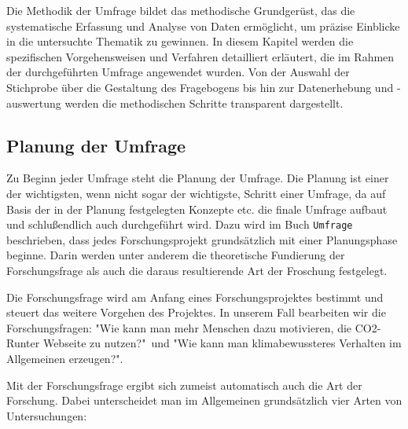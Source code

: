 
Die Methodik der Umfrage bildet das methodische Grundgerüst, das die systematische Erfassung und Analyse von Daten ermöglicht, um präzise Einblicke in die untersuchte Thematik zu gewinnen. In diesem Kapitel werden die spezifischen Vorgehensweisen und Verfahren detailliert erläutert, die im Rahmen der durchgeführten Umfrage angewendet wurden.
Von der Auswahl der Stichprobe über die Gestaltung des Fragebogens bis hin zur Datenerhebung und -auswertung werden die methodischen Schritte transparent dargestellt.

\subsection{Planung der Umfrage}
Zu Beginn jeder Umfrage steht die Planung der Umfrage.
Die Planung ist einer der wichtigsten, wenn nicht sogar der wichtigste, Schritt einer Umfrage, da auf Basis der in der Planung festgelegten Konzepte etc.
die finale Umfrage aufbaut und schlußendlich auch durchgeführt wird.
Dazu wird im Buch \texttt{Umfrage} beschrieben, dass jedes Forschungsprojekt grundsätzlich mit einer Planungsphase beginne.
Darin werden unter anderem die theoretische Fundierung der Forschungsfrage als auch die daraus resultierende Art der Froschung festgelegt.\cite{umfrage:2011}

Die Forschungsfrage wird am Anfang eines Forschungsprojektes bestimmt und steuert das weitere Vorgehen des Projektes. \cite{umfrage:2011}
In unserem Fall bearbeiten wir die Forschungsfragen: "Wie kann man mehr Menschen dazu motivieren, die CO2-Runter Webseite zu nutzen?"\ und "Wie kann man klimabewussteres Verhalten im Allgemeinen erzeugen?".

Mit der Forschungsfrage ergibt sich zumeist automatisch auch die Art der Forschung.
Dabei unterscheidet man im Allgemeinen grundsätzlich vier Arten von Untersuchungen:

